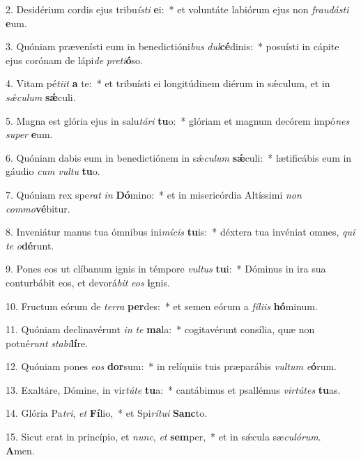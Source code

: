 2. Desidérium cordis ejus tribu\textit{ís}\textit{ti} \textbf{e}i:~*  et voluntáte labiórum ejus non \textit{frau}\textit{dás}\textit{ti} \textbf{e}um.\

3. Quóniam prævenísti eum in benedictióni\textit{bus} \textit{dul}\textbf{cé}dinis:~*  posuísti in cápite ejus corónam de lápi\textit{de} \textit{pre}\textit{ti}\textbf{ó}so.\

4. Vitam pé\textit{ti}\textit{it} \textbf{a} te:~*  et tribuísti ei longitúdinem diérum in sǽculum, et in \textit{sǽ}\textit{cu}\textit{lum} \textbf{sǽ}culi.\

5. Magna est glória ejus in salu\textit{tá}\textit{ri} \textbf{tu}o:~*  glóriam et magnum decórem impó\textit{nes} \textit{su}\textit{per} \textbf{e}um.\

6. Quóniam dabis eum in benedictiónem in sǽ\textit{cu}\textit{lum} \textbf{sǽ}culi:~*  lætificábis eum in gáudio \textit{cum} \textit{vul}\textit{tu} \textbf{tu}o.\

7. Quóniam rex spe\textit{rat} \textit{in} \textbf{Dó}mino:~*  et in misericórdia Altíssimi \textit{non} \textit{com}\textit{mo}\textbf{vé}bitur.\

8. Inveniátur manus tua ómnibus ini\textit{mí}\textit{cis} \textbf{tu}is:~*  déxtera tua invéniat omnes, \textit{qui} \textit{te} \textit{o}\textbf{dé}runt.\

9. Pones eos ut clíbanum ignis in témpore \textit{vul}\textit{tus} \textbf{tu}i:~*  Dóminus in ira sua conturbábit eos, et devorá\textit{bit} \textit{e}\textit{os} \textbf{i}gnis.\

10. Fructum eórum de \textit{ter}\textit{ra} \textbf{per}des:~*  et semen eórum a \textit{fí}\textit{li}\textit{is} \textbf{hó}minum.\

11. Quóniam declinavérunt \textit{in} \textit{te} \textbf{ma}la:~*  cogitavérunt consília, quæ non potué\textit{runt} \textit{sta}\textit{bi}\textbf{lí}re.\

12. Quóniam pones \textit{e}\textit{os} \textbf{dor}sum:~*  in relíquiis tuis præparábis \textit{vul}\textit{tum} \textit{e}\textbf{ó}rum.\

13. Exaltáre, Dómine, in vir\textit{tú}\textit{te} \textbf{tu}a:~*  cantábimus et psallémus \textit{vir}\textit{tú}\textit{tes} \textbf{tu}as.\

14. Glória Pa\textit{tri}, \textit{et} \textbf{Fí}lio,~*  et Spi\textit{rí}\textit{tu}\textit{i} \textbf{Sanc}to.\

15. Sicut erat in princípio, et \textit{nunc}, \textit{et} \textbf{sem}per,~*  et in sǽcula sæ\textit{cu}\textit{ló}\textit{rum}. \textbf{A}men.\

